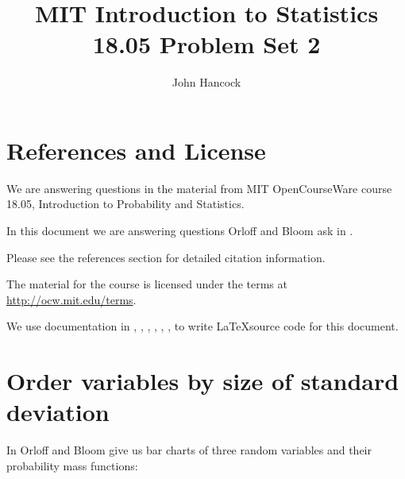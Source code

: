 \documentclass[a4paper,11pt]{article}
\author{John Hancock}
\title{MIT Introduction to Statistics 18.05 Problem Set 2 }
\begin{document}
\maketitle
\tableofcontents
\section{References and License}
We are answering questions in the material from MIT OpenCourseWare
course 18.05, Introduction to Probability and Statistics.

In this document we are answering questions Orloff and Bloom ask in
\cite{slides5}.

Please see the references section for detailed citation information.

The material for the course is licensed under the terms at
\url{http://ocw.mit.edu/terms}.

We use documentation in \cite{latexBarChart}, \cite{evalInt}, \cite{pfgPlots},
\cite{pfgPlots}, \cite{noDots}, \cite{normalDist}, \cite{tikzNormal}
to write \LaTeX source code for this document.
\section{Order variables by size of standard deviation}

In \cite{slides5} Orloff and Bloom give us bar charts of three random variables
and their probability mass functions:


\end{document}
